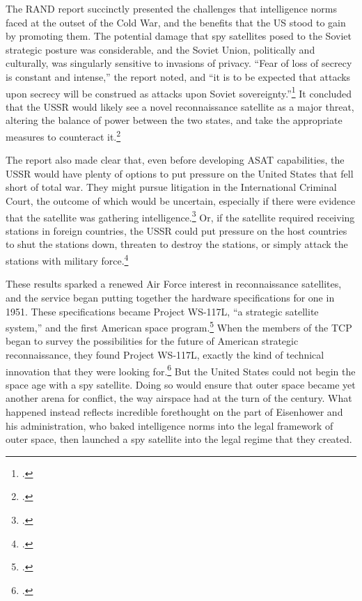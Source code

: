 \documentclass[11pt]{memoir}
\begin{document}
The RAND report succinctly presented the challenges that intelligence norms faced at the outset of the Cold War, and the benefits that the US stood to gain by promoting them. The potential damage that spy satellites posed to the Soviet strategic posture was considerable, and the Soviet Union, politically and culturally, was singularly sensitive to invasions of privacy. ``Fear of loss of secrecy is constant and intense,'' the report noted, and ``it is to be expected that attacks upon secrecy will be construed as attacks upon Soviet sovereignty.''\footcite[p.~14]{kecskemetic_satellite_1950} It concluded that the USSR would likely see a novel reconnaissance satellite as a major threat, altering the balance of power between the two states, and take the appropriate measures to counteract it.\footcite[p.~13]{kecskemetic_satellite_1950}

The report also made clear that, even before developing ASAT capabilities, the USSR would have plenty of options to put pressure on the United States that fell short of total war. They might pursue litigation in the International Criminal Court, the outcome of which would be uncertain, especially if there were evidence that the satellite was gathering intelligence.\footcite[p.~16]{kecskemetic_satellite_1950} Or, if the satellite required receiving stations in foreign countries, the USSR could put pressure on the host countries to shut the stations down, threaten to destroy the stations, or simply attack the stations with military force.\footcite[p.~16-17. Importantly, these are all things that the Soviet Union could also have done with the U-2 spy plane. In fact, they might have even been more effective. Unlike the U-2 planes that took off from allied airfields, the first spy satellite, Project Corona, ejected a film capsule and required no such receiving stations. The US was somewhat more circumspect with its overflights, but the options were there.]{kecskemetic_satellite_1950}

These results sparked a renewed Air Force interest in reconnaissance satellites, and the service began putting together the hardware specifications for one in 1951. These specifications became Project WS-117L, ``a strategic satellite system,'' and the first American space program.\footcite[p.~110-111. The WS is short for ``Weapons System.'']{mcdougall_heavens_1985} When the members of the TCP began to survey the possibilities for the future of American strategic reconnaissance, they found Project WS-117L, exactly the kind of technical innovation that they were looking for.\footcite[p.~197]{brugioni_eyes_2010} But the United States could not begin the space age with a spy satellite. Doing so would ensure that outer space became yet another arena for conflict, the way airspace had at the turn of the  century. What happened instead reflects incredible forethought on the part of Eisenhower and his administration, who baked intelligence norms into the legal framework of outer space, then launched a spy satellite into the legal regime that they created.
\end{document}
